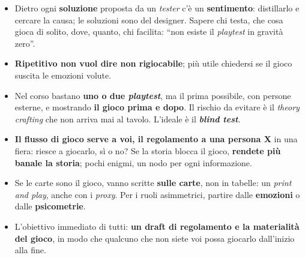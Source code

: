 \begin{itemize}
        implementazione + porte chiuse + \emph{form} per il modello matematico.
  \item Dietro ogni \textbf{soluzione} proposta da un \emph{tester} c'è un
        \textbf{sentimento}: distillarlo e cercare la causa; le soluzioni sono del
        designer. Sapere chi testa, che cosa gioca di solito, dove, quanto, chi facilita:
        ``non esiste il \emph{playtest} in gravità zero''.
  \item \textbf{Ripetitivo non vuol dire non rigiocabile}; più utile chiedersi se il
        gioco suscita le emozioni volute.
  \item Nel corso bastano \textbf{uno o due \emph{playtest}}, ma il prima possibile, con
        persone esterne, e mostrando \textbf{il gioco prima e dopo}. Il rischio da evitare è
        il \emph{theory crafting} che non arriva mai al tavolo. L'ideale è il
        \textbf{\emph{blind test}}.
  \item \textbf{Il flusso di gioco serve a voi, il regolamento a una persona X} in una
        fiera: riesce a giocarlo, sì o no? Se la storia blocca il gioco, \textbf{rendete
        più banale la storia}; pochi enigmi, un nodo per ogni informazione.
  \item Se le carte sono il gioco, vanno scritte \textbf{sulle carte}, non in tabelle:
        un \emph{print and play}, anche con i \emph{proxy}. Per i ruoli asimmetrici,
        partire dalle \textbf{emozioni} o dalle \textbf{psicometrie}.
  \item L'obiettivo immediato di tutti: \textbf{un draft di regolamento e la materialità
        del gioco}, in modo che qualcuno che non siete voi possa giocarlo dall'inizio alla
        fine.
\end{itemize}
